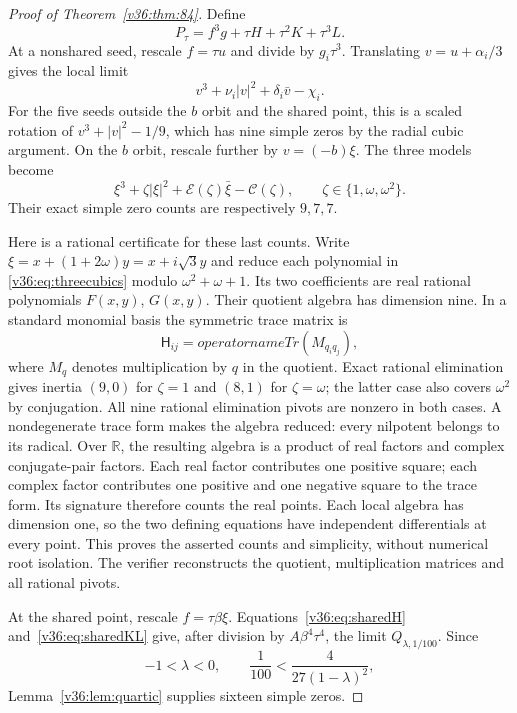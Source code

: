 \documentclass[UTF8,11pt]{ctexart}
\theoremstyle{definition}
\numberwithin{equation}{section}
\begin{document}
\begin{proof}[Proof of Theorem~\ref{v36:thm:84}]
Define
\begin{equation}\label{v36:eq:family}
                  P_\tau=f^3g+\tau H+\tau^2K+\tau^3L.
\end{equation}
At a nonshared seed, rescale $f=\tau u$ and divide by
$g_i\tau^3$. Translating $v=u+\alpha_i/3$ gives the local
limit
\begin{equation}\label{v36:eq:cubiclimit}
                         v^3+\nu_i|v|^2+\delta_i\bar v-\chi_i.
\end{equation}
For the five seeds outside the $b$ orbit and the shared point,
this is a scaled rotation of $v^3+|v|^2-1/9$, which has nine
simple zeros by the radial cubic argument.
On the $b$ orbit, rescale further by $v=(-b)\xi$. The three
models become
\begin{equation}\label{v36:eq:threecubics}
       \xi^3+\zeta|\xi|^2+\mathcal E(\zeta)\bar\xi
                    -\mathcal C(\zeta),
       \qquad \zeta\in\{1,\omega,\omega^2\}.
\end{equation}
Their exact simple zero counts are respectively $9,7,7$.

Here is a rational certificate for these last counts. Write
$\xi=x+(1+2\omega)y=x+i\sqrt3y$ and reduce each polynomial
in \eqref{v36:eq:threecubics} modulo $\omega^2+\omega+1$.
Its two coefficients are real rational polynomials $F(x,y)$,
$G(x,y)$. Their quotient algebra has dimension nine.
In a standard monomial basis the symmetric trace matrix is
\[
              \mathsf H_{ij}=operatorname{Tr}(M_{q_iq_j}),
\]
where $M_q$ denotes multiplication by $q$ in the quotient.
Exact rational elimination gives inertia $(9,0)$ for
$\zeta=1$ and $(8,1)$ for $\zeta=\omega$; the latter case
also covers $\omega^2$ by conjugation. All nine rational
elimination pivots are nonzero in both cases. A nondegenerate
trace form makes the algebra reduced: every nilpotent belongs
to its radical. Over $\mathbb R$, the resulting algebra is
a product of real factors and complex conjugate-pair factors.
Each real factor contributes one positive square; each complex
factor contributes one positive and one negative square to
the trace form. Its signature therefore counts the real points.
Each local algebra has dimension one, so the two defining
equations have independent differentials at every point.
This proves the asserted counts and simplicity, without
numerical root isolation. The verifier reconstructs the quotient,
multiplication matrices and all rational pivots.

At the shared point, rescale $f=\tau\beta\xi$.
Equations~\eqref{v36:eq:sharedH} and~\eqref{v36:eq:sharedKL}
give, after division by $A\beta^4\tau^4$, the limit
$Q_{\lambda,1/100}$. Since
\[
 -1<\lambda<0,\qquad \frac1{100}<\frac4{27(1-\lambda)^2},
\]
Lemma~\ref{v36:lem:quartic} supplies sixteen simple zeros.


\end{proof}
\end{document}
